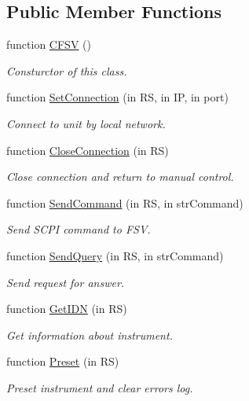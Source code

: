 \subsection*{Public Member Functions}
\begin{DoxyCompactItemize}
\item 
function \hyperlink{class_c_f_s_v_a21bda715aa6bd2ab1ef9c15953a00871}{C\-F\-S\-V} ()
\begin{DoxyCompactList}\small\item\em Consturctor of this class. \end{DoxyCompactList}\item 
function \hyperlink{class_c_f_s_v_a0ece0fccd00cfc33f87bb4d060ae936a}{Set\-Connection} (in R\-S, in I\-P, in port)
\begin{DoxyCompactList}\small\item\em Connect to unit by local network. \end{DoxyCompactList}\item 
function \hyperlink{class_c_f_s_v_af7fd6ac3853cd4d5ab6beeb29d0fe3b6}{Close\-Connection} (in R\-S)
\begin{DoxyCompactList}\small\item\em Close connection and return to manual control. \end{DoxyCompactList}\item 
function \hyperlink{class_c_f_s_v_a300a6d255e74ef7f84444320a692840a}{Send\-Command} (in R\-S, in str\-Command)
\begin{DoxyCompactList}\small\item\em Send S\-C\-P\-I command to F\-S\-V. \end{DoxyCompactList}\item 
function \hyperlink{class_c_f_s_v_a055274294fa172b93a384ca06a3987da}{Send\-Query} (in R\-S, in str\-Command)
\begin{DoxyCompactList}\small\item\em Send request for answer. \end{DoxyCompactList}\item 
function \hyperlink{class_c_f_s_v_a3f2932bbb46ec258203bf50ef18401d4}{Get\-I\-D\-N} (in R\-S)
\begin{DoxyCompactList}\small\item\em Get information about instrument. \end{DoxyCompactList}\item 
function \hyperlink{class_c_f_s_v_a58ed3f3f8b29226e29f35b43ed3f78df}{Preset} (in R\-S)
\begin{DoxyCompactList}\small\item\em Preset instrument and clear errors log. \end{DoxyCompactList}\item 

\end{DoxyCompactItemize}
